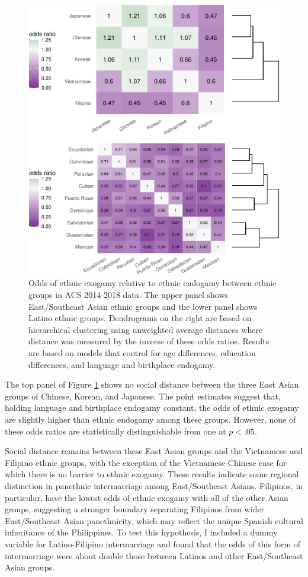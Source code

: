 \documentclass[11pt,]{article}
\begin{document}
\begin{figure}
\centering
\includegraphics{main_files/figure-latex/ethnic-heat-map-1.pdf}
\caption{\label{fig:ethnic-heat-map}Odds of ethnic exogamy relative to ethnic endogamy between ethnic groups in ACS 2014-2018 data. The upper panel shows East/Southeast Asian ethnic groups and the lower panel shows Latino ethnic groups. Dendrograms on the right are based on hierarchical clustering using unweighted average distances where distance was measured by the inverse of these odds ratios. Results are based on models that control for age differences, education differences, and language and birthplace endogamy.}
\end{figure}

The top panel of Figure \ref{fig:ethnic-heat-map} shows no social distance between the three East Asian groups of Chinese, Korean, and Japanese. The point estimates suggest that, holding language and birthplace endogamy constant, the odds of ethnic exogamy are slightly higher than ethnic endogamy among these groups. However, none of these odds ratios are statistically distinguishable from one at \(p<.05\).

Social distance remains between these East Asian groups and the Vietnamese and Filipino ethnic groups, with the exception of the Vietnamese-Chinese case for which there is no barrier to ethnic exogamy. These results indicate some regional distinction in panethnic intermarriage among East/Southeast Asians. Filipinos, in particular, have the lowest odds of ethnic exogamy with all of the other Asian groups, suggesting a stronger boundary separating Filipinos from wider East/Southeast Asian panethnicity, which may reflect the unique Spanish cultural inheritance of the Philippines. To test this hypothesis, I included a dummy variable for Latino-Filipino intermarriage and found that the odds of this form of intermarriage were about double those between Latinos and other East/Southeast Asian groups.
\end{document}
